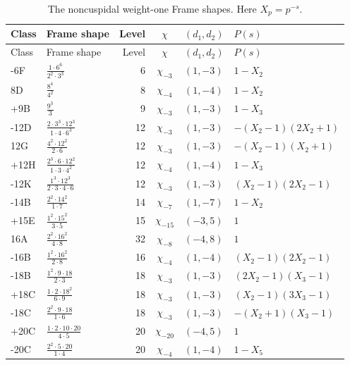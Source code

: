 \begin{longtable}{@{}llrcll@{}}
\caption{The noncuspidal weight-one Frame shapes. Here \(X_p=p^{-s}\).}\\
\toprule Class&Frame shape&Level&\(\chi\)&\((d_1,d_2)\)&\(P(s)\)\\\midrule\endfirsthead
\toprule Class&Frame shape&Level&\(\chi\)&\((d_1,d_2)\)&\(P(s)\)\\\midrule\endhead
-6F & $\frac{1\cdot6^{6}}{2^{2}\cdot3^{3}}$ & 6 & $\chi_{-3}$ & $(1,-3)$ & $1 - X_{2}$ \\
8D & $\frac{8^{4}}{4^{2}}$ & 8 & $\chi_{-4}$ & $(1,-4)$ & $1 - X_{2}$ \\
+9B & $\frac{9^{3}}{3}$ & 9 & $\chi_{-3}$ & $(1,-3)$ & $1 - X_{3}$ \\
-12D & $\frac{2\cdot3^{3}\cdot12^{3}}{1\cdot4\cdot6^{3}}$ & 12 & $\chi_{-3}$ & $(1,-3)$ & $- (X_{2} - 1) (2 X_{2} + 1)$ \\
12G & $\frac{4^{2}\cdot12^{2}}{2\cdot6}$ & 12 & $\chi_{-3}$ & $(1,-3)$ & $- (X_{2} - 1) (X_{2} + 1)$ \\
+12H & $\frac{2^{3}\cdot6\cdot12^{2}}{1\cdot3\cdot4^{2}}$ & 12 & $\chi_{-4}$ & $(1,-4)$ & $1 - X_{3}$ \\
-12K & $\frac{1^{3}\cdot12^{3}}{2\cdot3\cdot4\cdot6}$ & 12 & $\chi_{-3}$ & $(1,-3)$ & $(X_{2} - 1) (2 X_{2} - 1)$ \\
-14B & $\frac{2^{2}\cdot14^{2}}{1\cdot7}$ & 14 & $\chi_{-7}$ & $(1,-7)$ & $1 - X_{2}$ \\
+15E & $\frac{1^{2}\cdot15^{2}}{3\cdot5}$ & 15 & $\chi_{-15}$ & $(-3,5)$ & $1$ \\
16A & $\frac{2^{2}\cdot16^{2}}{4\cdot8}$ & 32 & $\chi_{-8}$ & $(-4,8)$ & $1$ \\
-16B & $\frac{1^{2}\cdot16^{2}}{2\cdot8}$ & 16 & $\chi_{-4}$ & $(1,-4)$ & $(X_{2} - 1) (2 X_{2} - 1)$ \\
-18B & $\frac{1^{2}\cdot9\cdot18}{2\cdot3}$ & 18 & $\chi_{-3}$ & $(1,-3)$ & $(2 X_{2} - 1) (X_{3} - 1)$ \\
+18C & $\frac{1\cdot2\cdot18^{2}}{6\cdot9}$ & 18 & $\chi_{-3}$ & $(1,-3)$ & $(X_{2} - 1) (3 X_{3} - 1)$ \\
-18C & $\frac{2^{2}\cdot9\cdot18}{1\cdot6}$ & 18 & $\chi_{-3}$ & $(1,-3)$ & $- (X_{2} + 1) (X_{3} - 1)$ \\
+20C & $\frac{1\cdot2\cdot10\cdot20}{4\cdot5}$ & 20 & $\chi_{-20}$ & $(-4,5)$ & $1$ \\
-20C & $\frac{2^{2}\cdot5\cdot20}{1\cdot4}$ & 20 & $\chi_{-4}$ & $(1,-4)$ & $1 - X_{5}$ \\

\end{longtable}
